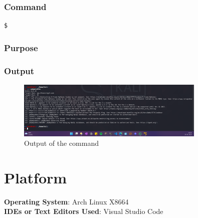 \documentclass[11pt]{article}
\begin{document}
\subsubsection*{Command}
\begin{verbatim}
$
\end{verbatim}

\subsubsection*{Purpose}

\subsubsection*{Output}
\begin{figure}[H]
    \centering
    \includegraphics[width=0.8\textwidth]{assignment 8 (8).png}
    \caption{Output of the command}
    \label{fig:1}
\end{figure}


\section{Platform}
\textbf{Operating System}: Arch Linux X8664 \\
\textbf{IDEs or Text Editors Used}: Visual Studio Code\\

% 
\end{document}
